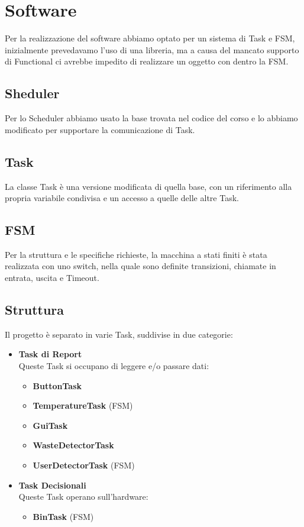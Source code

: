 \documentclass[a4paper,12pt]{report}
\begin{document}
\chapter{Software}
Per la realizzazione del software abbiamo optato per un sistema di Task e FSM,
inizialmente prevedavamo l'uso di una libreria, ma a causa del mancato supporto di Functional
ci avrebbe impedito di realizzare un oggetto con dentro la FSM.
\section{Sheduler}
Per lo Scheduler abbiamo usato la base trovata nel codice del corso e lo abbiamo 
modificato per supportare la comunicazione di Task.
\section{Task}
La classe Task è una versione modificata di quella base, con un riferimento alla propria 
variabile condivisa e un accesso a quelle delle altre Task.
\section{FSM}
Per la struttura e le specifiche richieste, la macchina a stati finiti
è stata realizzata con uno switch, nella quale sono definite transizioni, chiamate in entrata, uscita
e Timeout.
\newpage
\section{Struttura}
Il progetto è separato in varie Task, suddivise in due categorie:
\begin{itemize}
    \item \textbf{Task di Report} \\
    Queste Task si occupano di leggere e/o passare dati:
    \begin{itemize}
        \item \textbf{ButtonTask}
        \item \textbf{TemperatureTask} (FSM)
        \item \textbf{GuiTask}
        \item \textbf{WasteDetectorTask}
        \item \textbf{UserDetectorTask} (FSM)
    \end{itemize}
    
    \item \textbf{Task Decisionali} \\
    Queste Task operano sull'hardware:
    \begin{itemize}
        \item \textbf{BinTask} (FSM)
    \end{itemize}
\end{itemize}
\end{document}
